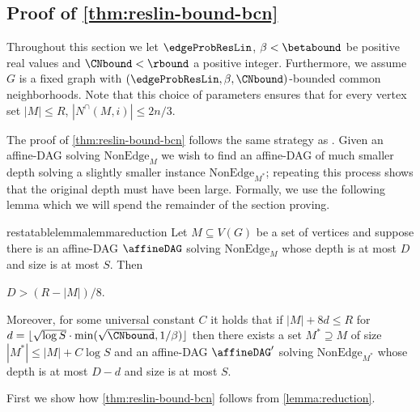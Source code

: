 \subsection{Proof of \autoref{thm:reslin-bound-bcn}}

Throughout this section we let $\edgeProbResLin$, $\beta<\betabound$ be positive real values and $\CNbound<\rbound$ a positive integer. Furthermore, we assume $G$ is a fixed graph with $(\edgeProbResLin,\beta,\CNbound)$-bounded common neighborhoods. Note that this choice of parameters ensures that for every vertex set $|M|\leq R$, $|N^\cap(M,i)|\leq2n/3$.

The proof of \autoref{thm:reslin-bound-bcn} follows the same strategy as \cite{BI25bphp}. Given an affine-DAG solving $\mathrm{NonEdge}_M$ we wish to find an affine-DAG of much smaller depth solving a slightly smaller instance $\mathrm{NonEdge}_{M^*}$; repeating this process shows that the original depth must have been large. Formally, we use the following lemma which we will spend the remainder of the section proving.

\begin{restatable}{restatablelemma}{lemmareduction}
    \label{lemma:reduction}
    Let $M\subseteq V(G)$ be a set of vertices 
    and suppose there is an affine-DAG $\affineDAG$ solving $\textrm{NonEdge}_M$ whose depth is at most $D$ and size is at most $S$. Then 

    $D>(R-|M|)/8$.
    
    Moreover, for some universal constant $C$ it holds that if $|M|+8d\leq R$ for $d=\lfloor \sqrt{\log S} \cdot \min(\sqrt\CNbound,1/\beta)\rfloor$ 
    then there exists a set
    $M^*\supseteq M$ of size $|M^*|\leq |M|+C\log S$ and an affine-DAG $\affineDAG'$ solving $\textrm{NonEdge}_{M^*}$ whose depth is at most $D-d$ and size is at most $S$. 
\end{restatable}

First we show how \autoref{thm:reslin-bound-bcn} follows from \autoref{lemma:reduction}.

